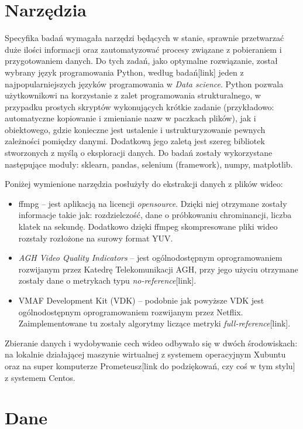 \section{Narzędzia}
Specyfika badań wymagała narzędzi będących w stanie, sprawnie przetwarzać duże ilości informacji oraz zautomatyzować procesy związane z pobieraniem i przygotowaniem danych. Do tych zadań, jako optymalne rozwiązanie, został wybrany język programowania Python, według badań[link] jeden z najpopularniejszych języków programowania w {\em Data science}. Python pozwala użytkownikowi na korzystanie z zalet programowania strukturalnego, w przypadku prostych skryptów wykonujących krótkie zadanie (przykładowo: automatyczne kopiowanie i zmienianie nazw w paczkach plików), jak i obiektowego, gdzie konieczne jest ustalenie i ustrukturyzowanie pewnych zależności pomiędzy danymi. Dodatkową jego zaletą jest szereg bibliotek stworzonych z myślą o eksploracji danych. Do badań zostały wykorzystane następujące moduły: sklearn, pandas, selenium (framework), numpy, matplotlib.\par\par
Poniżej wymienione narzędzia posłużyły do ekstrakcji danych z plików wideo:
\begin{itemize}[label=$\bullet$]
\item ffmpg -- jest aplikacją na licencji {\em opensource}. Dzięki niej otrzymane zostały informacje takie jak: rozdzielczość, dane o próbkowaniu chrominancji, liczba klatek na sekundę. Dodatkowo dzięki ffmpeg skompresowane pliki wideo rozstały rozłożone na surowy format YUV.
\item {\em AGH Video Quality Indicators} -- jest ogólnodostępnym oprogramowaniem rozwijanym przez Katedrę Telekomunikacji AGH, przy jego użyciu otrzymane zostały dane o metrykach typu {\em no-reference}[link].
\item VMAF Development Kit (VDK) -- podobnie jak powyższe VDK jest ogólnodostępnym oprogramowaniem rozwijanym przez Netflix. Zaimplementowane tu zostały algorytmy liczące metryki {\em full-reference}[link].
\end{itemize}
Zbieranie danych i wydobywanie cech wideo odbywało się w dwóch środowiskach: na lokalnie działającej maszynie wirtualnej z systemem operacyjnym Xubuntu oraz na super komputerze Prometeusz[link do podziękowań, czy coś w tym stylu] z systemem Centos. 

\label{cha:drugiDokument}



\section{Dane}
\label{cha:drugiDokument}

